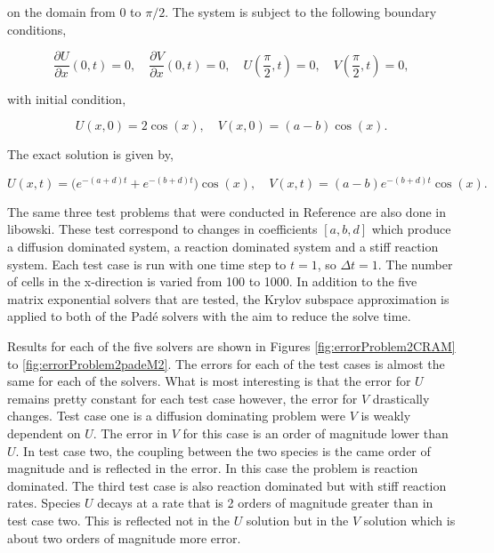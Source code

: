 \noindent on the domain from $0$ to $\pi/2$. The system is subject to the following boundary conditions, 

\begin{equation}
    \frac{\partial U}{\partial x}(0,t) = 0, \quad \frac{\partial V}{\partial x}(0,t) = 0, \quad U(\frac{\pi}{2}, t) = 0, \quad V(\frac{\pi}{2}, t)= 0,
\end{equation}

\noindent with initial condition,

\begin{equation}
    U(x,0) = 2\cos(x), \quad V(x,0) = (a-b)\cos(x).
\end{equation}

\noindent The exact solution is given by,

\begin{equation}
    U(x,t) = \bigg( e^{-(a+d)t} + e^{-(b+d)t}\bigg)\cos(x), \quad V(x,t) = (a - b) e^{-(b+d)t}\cos(x).
\end{equation}

The same three test problems that were conducted in Reference \cite{ching2007} are also done in libowski. These test correspond to changes in coefficients $[a, b, d]$ which produce a diffusion dominated system, a reaction dominated system and a stiff reaction system. Each test case is run with one time step to $t = 1$, so $\Delta t = 1$. The number of cells in the x-direction is varied from 100 to 1000. In addition to the five matrix exponential solvers that are tested, the Krylov subspace approximation is applied to both of the Pad\'e solvers with the aim to reduce the solve time. 

Results for each of the five solvers are shown in Figures \ref{fig:errorProblem2CRAM} to \ref{fig:errorProblem2padeM2}. The errors for each of the test cases is almost the same for each of the solvers. What is most interesting is that the error for $U$ remains pretty constant for each test case however, the error for $V$ drastically changes. Test case one is a diffusion dominating problem were $V$ is weakly dependent on $U$. The error in $V$ for this case is an order of magnitude lower than $U$. In test case two, the coupling between the two species is the came order of magnitude and is reflected in the error. In this case the problem is reaction dominated. The third test case is also reaction dominated but with stiff reaction rates. Species $U$ decays at a rate that is 2 orders of magnitude greater than in test case two. This is reflected not in the $U$ solution but in the $V$ solution which is about two orders of magnitude more error. 

